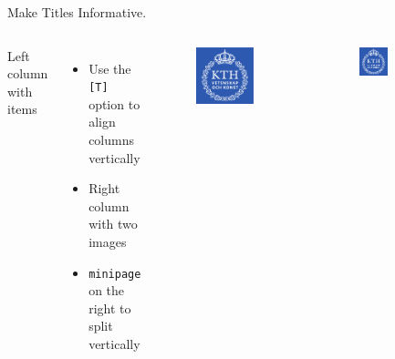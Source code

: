 \documentclass{beamer}
\begin{document}
\begin{frame}{Make Titles Informative.}
  \begin{columns}[T]
      Left column with items
      \begin{itemize}
      \item
        Use the \texttt{[T]} option to align columns vertically
      \item
        Right column with two images
      \item
        \texttt{minipage} on the right to split vertically
      \end{itemize}
      \begin{minipage}[c][0.35\textheight][c]{0.9\textwidth}
        \begin{figure}
          \includegraphics[width=0.8\textwidth]{img/logo.pdf}
        \end{figure}
      \end{minipage}
      \begin{minipage}[c][0.35\textheight][c]{0.9\textwidth}
        \begin{figure}
          \includegraphics[width=0.4\textwidth]{img/logo.pdf}%

\end{figure}
\end{minipage}
\end{columns}
\end{frame}
\end{document}
